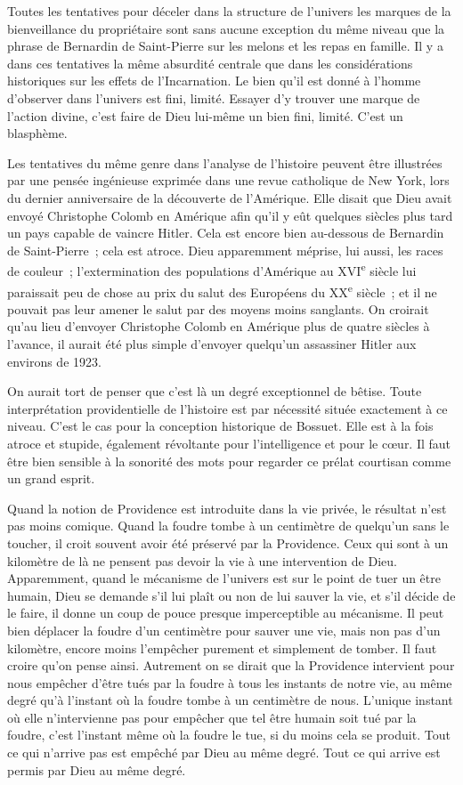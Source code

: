 \documentclass[french,twoside]{book} %
\begin{document}
Toutes les tentatives pour déceler dans la structure de l'univers les marques de la bienveillance du propriétaire sont sans aucune exception du même niveau que la phrase de Bernardin de Saint-Pierre sur les melons et les repas en famille. Il y a dans ces tentatives la même absurdité centrale que dans les considérations historiques sur les effets de l'Incarnation. Le bien qu'il est donné à l'homme d'observer dans l'univers est fini, limité. Essayer d'y trouver une marque de l'action divine, c'est faire de Dieu lui-même un bien fini, limité. C'est un blasphème.\par
Les tentatives du même genre dans l'analyse de l'histoire peuvent être illustrées par une pensée ingénieuse exprimée dans une revue catholique de New York, lors du dernier anniversaire de la découverte de l'Amérique. Elle disait que Dieu avait envoyé Christophe Colomb en Amérique afin qu'il y eût quelques siècles plus tard un pays capable de vaincre Hitler. Cela est encore bien au-dessous de Bernardin de Saint-Pierre ; cela est atroce. Dieu apparemment méprise, lui aussi, les races de couleur ; l'extermination des populations d'Amérique au XVI\textsuperscript{e} siècle lui paraissait peu de chose au prix du salut des Européens du XX\textsuperscript{e} siècle ; et il ne pouvait pas leur amener le salut par des moyens moins sanglants. On croirait qu'au lieu d'envoyer Christophe Colomb en Amérique plus de quatre siècles à l'avance, il aurait été plus simple d'envoyer quelqu'un assassiner Hitler aux environs de 1923.\par
On aurait tort de penser que c'est là un degré exceptionnel de bêtise. Toute interprétation providentielle de l'histoire est par nécessité située exactement à ce niveau. C'est le cas pour la conception historique de Bossuet. Elle est à la fois atroce et stupide, également révoltante pour l'intelligence et pour le cœur. Il faut être bien sensible à la sonorité des mots pour regarder ce prélat courtisan comme un grand esprit.\par
Quand la notion de Providence est introduite dans la vie privée, le résultat n'est pas moins comique. Quand la foudre tombe à un centimètre de quelqu'un sans le toucher, il croit souvent avoir été préservé par la Providence. Ceux qui sont à un kilomètre de là ne pensent pas devoir la vie à une intervention de Dieu. Apparemment, quand le mécanisme de l'univers est sur le point de tuer un être humain, Dieu se demande s'il lui plaît ou non de lui sauver la vie, et s'il décide de le faire, il donne un coup de pouce presque imperceptible au mécanisme. Il peut bien déplacer la foudre d'un centimètre pour sauver une vie, mais non pas d'un kilomètre, encore moins l'empêcher purement et simplement de tomber. Il faut croire qu'on pense ainsi. Autrement on se dirait que la Providence intervient pour nous empêcher d'être tués par la foudre à tous les instants de notre vie, au même degré qu'à l'instant où la foudre tombe à un centimètre de nous. L'unique instant où elle n'intervienne pas pour empêcher que tel être humain soit tué par la foudre, c'est l'instant même où la foudre le tue, si du moins cela se produit. Tout ce qui n'arrive pas est empêché par Dieu au même degré. Tout ce qui arrive est permis par Dieu au même degré.\par
\end{document}
